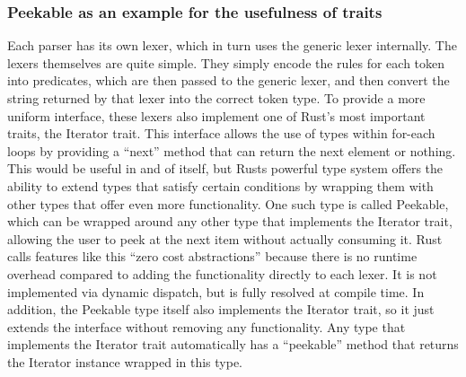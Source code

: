 \subsubsection{Peekable as an example for the usefulness of traits}
Each parser has its own lexer, which in turn uses the generic lexer internally.
The lexers themselves are quite simple.
They simply encode the rules for each token into predicates, which are then passed to the generic lexer, and then convert the string returned by that lexer into the correct token type.
To provide a more uniform interface, these lexers also implement one of Rust's most important traits, the Iterator trait.
This interface allows the use of types within for-each loops by providing a ``next'' method that can return the next element or nothing.
This would be useful in and of itself, but Rusts powerful type system offers the ability to extend types that satisfy certain conditions by wrapping them with other types that offer even more functionality.
One such type is called Peekable, which can be wrapped around any other type that implements the Iterator trait, allowing the user to peek at the next item without actually consuming it.
Rust calls features like this ``zero cost abstractions'' because there is no runtime overhead compared to adding the functionality directly to each lexer.
It is not implemented via dynamic dispatch, but is fully resolved at compile time.
In addition, the Peekable type itself also implements the Iterator trait, so it just extends the interface without removing any functionality.
Any type that implements the Iterator trait automatically has a ``peekable'' method that returns the Iterator instance wrapped in this type.

